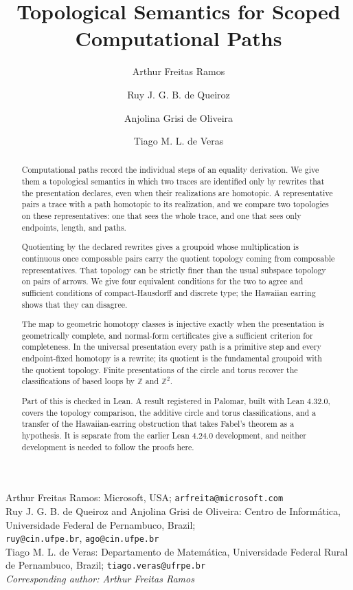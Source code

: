 \documentclass[10pt,reqno]{amsart}
\title[Topological Semantics for Scoped Computational Paths]
  {Topological Semantics for Scoped Computational Paths}
\author{Arthur Freitas Ramos}
\author{Ruy J. G. B. de Queiroz}
\author{Anjolina Grisi de Oliveira}
\author{Tiago M. L. de Veras}
\theoremstyle{definition}
\theoremstyle{plain}
\theoremstyle{remark}
\begin{document}
\raggedbottom

\begin{abstract}
Computational paths record the individual steps of an equality derivation.
We give them a topological semantics in which two traces are identified only
by rewrites that the presentation declares, even when their realizations are
homotopic.  A representative pairs a trace with a path homotopic to its
realization, and we compare two topologies on these representatives: one that
sees the whole trace, and one that sees only endpoints, length, and paths.

Quotienting by the declared rewrites gives a groupoid whose multiplication is
continuous once composable pairs carry the quotient topology coming from
composable representatives.  That topology can be strictly finer than the
usual subspace topology on pairs of arrows.  We give four equivalent
conditions for the two to agree and sufficient conditions of compact-Hausdorff
and discrete type; the Hawaiian earring shows that they can disagree.

The map to geometric homotopy classes is injective exactly when the
presentation is geometrically complete, and normal-form certificates give a
sufficient criterion for completeness.  In the universal presentation every
path is a primitive step and every endpoint-fixed homotopy is a rewrite; its
quotient is the fundamental groupoid with the quotient topology.  Finite
presentations of the circle and torus recover the classifications of based
loops by $\mathbb Z$ and $\mathbb Z^2$.

Part of this is checked in Lean.  A result registered in Palomar, built with
Lean 4.32.0, covers the topology comparison, the additive circle and torus
classifications, and a transfer of the Hawaiian-earring obstruction that takes
Fabel's theorem as a hypothesis.  It is separate from the earlier Lean 4.24.0
development, and neither development is needed to follow the proofs here.

\end{abstract}

\maketitle

\begin{center}
\footnotesize
Arthur Freitas Ramos: Microsoft, USA; \texttt{arfreita@microsoft.com}\\
Ruy J. G. B. de Queiroz and Anjolina Grisi de Oliveira: Centro de
Inform\'atica, Universidade Federal de Pernambuco, Brazil;\\
\texttt{ruy@cin.ufpe.br}, \texttt{ago@cin.ufpe.br}\\
Tiago M. L. de Veras: Departamento de Matem\'atica, Universidade Federal
Rural de Pernambuco, Brazil; \texttt{tiago.veras@ufrpe.br}\\[2pt]
\emph{Corresponding author: Arthur Freitas Ramos}
\end{center}
\enlargethispage{7pt}
\end{document}
